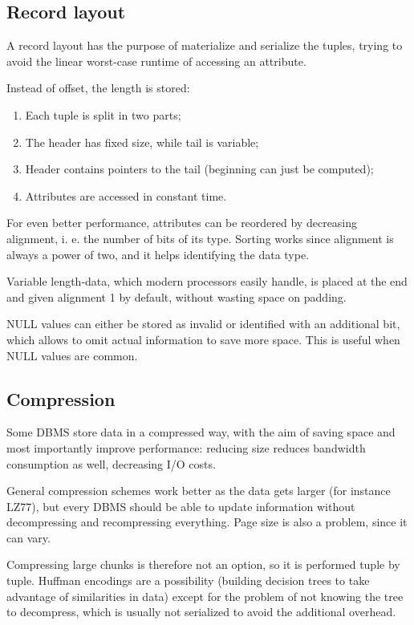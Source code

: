 \subsection{Record layout}
A record layout has the purpose of materialize and serialize the tuples, trying to avoid the linear worst-case runtime of accessing an attribute. 

Instead of offset, the length is stored:
\begin{enumerate}
	\item Each tuple is split in two parts;
	\item The header has fixed size, while tail is variable;
	\item Header contains pointers to the tail (beginning can just be computed);
	\item Attributes are accessed in constant time.
\end{enumerate}
For even better performance, attributes can be reordered by decreasing alignment, i. e. the number of bits of its type. Sorting works since alignment is always a power of two, and it helps identifying the data type. 

Variable length-data, which modern processors easily handle, is placed at the end and given alignment 1 by default, without wasting space on padding.

NULL values can either be stored as invalid or identified with an additional bit, which allows to omit actual information to save more space. This is useful when NULL values are common.

\subsection{Compression}
Some DBMS store data in a compressed way, with the aim of saving space and most importantly improve performance: reducing size reduces bandwidth consumption as well, decreasing I/O costs.

General compression schemes work better as the data gets larger (for instance LZ77), but every DBMS should be able to update information without decompressing and recompressing everything. Page size is also a problem, since it can vary.

Compressing large chunks is therefore not an option, so it is performed tuple by tuple. Huffman encodings are a possibility (building decision trees to take advantage of similarities in data) except for the problem of not knowing the tree to decompress, which is usually not serialized to avoid the additional overhead. 

